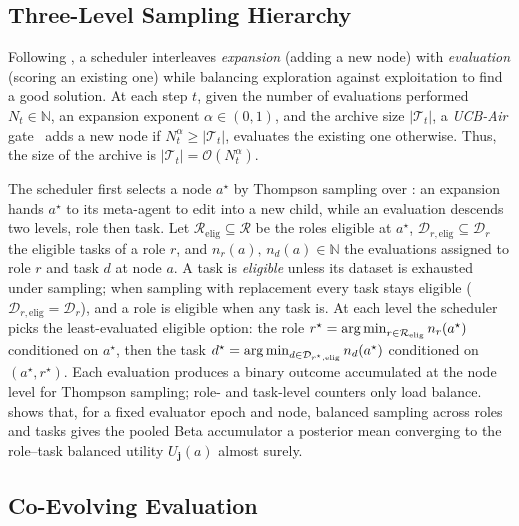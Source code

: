 \subsection{Three-Level Sampling Hierarchy}
\label{sec:method:hierarchy}

Following \citet{wang2025huxley}, a scheduler interleaves \emph{expansion} (adding a new node) with \emph{evaluation} (scoring an existing one) while balancing exploration against exploitation to find a good solution. At each step $t$, given the number of evaluations performed $N_t\in\mathbb{N}$, an expansion exponent $\alpha\in(0,1)$, and the archive size $|\mathcal{T}_t|$, a \emph{UCB-Air} gate~\citep{NIPS200849ae49a2} adds a new node if $N_t^{\alpha} \ge |\mathcal{T}_t|$, evaluates the existing one otherwise. Thus, the size of the archive is $|\mathcal{T}_t|=\mathcal{O}(N_t^{\alpha})$.

The scheduler first selects a node $a^\star$ by Thompson sampling over \cmp: an expansion hands $a^\star$ to its meta-agent to edit into a new child, while an evaluation descends two levels, role then task. Let $\mathcal{R}_{\mathrm{elig}}\subseteq\mathcal{R}$ be the roles eligible at $a^\star$, $\mathcal{D}_{r,\mathrm{elig}}\subseteq\mathcal{D}_r$ the eligible tasks of a role $r$, and $n_r(a),\,n_d(a)\in\mathbb{N}$ the evaluations assigned to role $r$ and task $d$ at node $a$. A task is \emph{eligible} unless its dataset is exhausted under sampling; when sampling with replacement every task stays eligible ($\mathcal{D}_{r,\mathrm{elig}}=\mathcal{D}_r$), and a role is eligible when any task is. At each level the scheduler picks the least-evaluated eligible option: the role $r^\star=\operatorname*{arg\,min}_{r\in\mathcal{R}_{\mathrm{elig}}} n_r(a^\star)$ conditioned on $a^\star$, then the task $d^\star=\operatorname*{arg\,min}_{d\in\mathcal{D}_{r^\star,\mathrm{elig}}} n_d(a^\star)$ conditioned on $(a^\star,r^\star)$. Each evaluation produces a binary outcome accumulated at the node level for Thompson sampling; role- and task-level counters only load balance.  shows that, for a fixed evaluator epoch and node, balanced sampling across roles and tasks gives the pooled Beta accumulator a posterior mean converging to the role--task balanced utility $U_{\boldsymbol{j}}(a)$ almost surely.


\subsection{Co-Evolving Evaluation}
\label{sec:method:generative}

